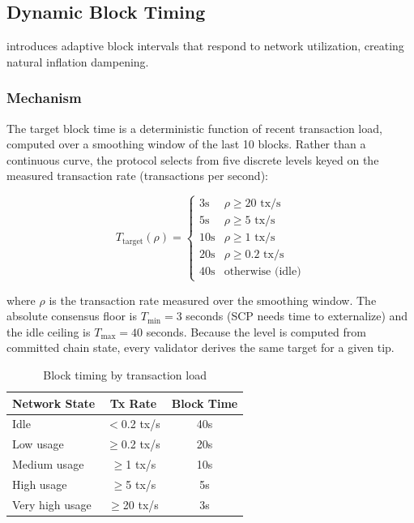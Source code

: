 

\subsection{Dynamic Block Timing}
\label{sec:dynamic-timing}

\Botho introduces adaptive block intervals that respond to network
utilization, creating natural inflation dampening.

\subsubsection{Mechanism}

The target block time is a deterministic function of recent transaction
load, computed over a smoothing window of the last 10 blocks. Rather than a
continuous curve, the protocol selects from five discrete levels keyed on the
measured transaction rate (transactions per second):

\begin{equation}
T_{\text{target}}(\rho) =
\begin{cases}
3\text{s}  & \rho \geq 20 \text{ tx/s} \\
5\text{s}  & \rho \geq 5  \text{ tx/s} \\
10\text{s} & \rho \geq 1  \text{ tx/s} \\
20\text{s} & \rho \geq 0.2 \text{ tx/s} \\
40\text{s} & \text{otherwise (idle)}
\end{cases}
\end{equation}

where $\rho$ is the transaction rate measured over the smoothing window.
The absolute consensus floor is $T_{\min} = 3$ seconds (SCP needs time to
externalize) and the idle ceiling is $T_{\max} = 40$ seconds. Because the
level is computed from committed chain state, every validator derives the
same target for a given tip.

\begin{table}[h]
\centering
\caption{Block timing by transaction load}
\label{tab:timing-util}
\begin{tabular}{@{}lcc@{}}
\toprule
\textbf{Network State} & \textbf{Tx Rate} & \textbf{Block Time} \\
\midrule
Idle & $<$0.2 tx/s & 40s \\
Low usage & $\geq$0.2 tx/s & 20s \\
Medium usage & $\geq$1 tx/s & 10s \\
High usage & $\geq$5 tx/s & 5s \\
Very high usage & $\geq$20 tx/s & 3s \\
\bottomrule
\end{tabular}
\end{table}

